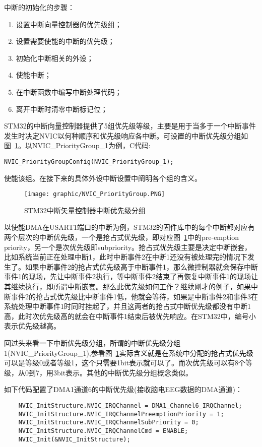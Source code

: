 	中断的初始化的步骤：
\begin{enumerate}
\item	设置中断向量控制器的优先级组；
\item	设置需要使能的中断的优先级；
\item	初始化中断相关的外设；
\item	使能中断；
\item	在中断函数中编写中断处理代码；
\item	离开中断时清零中断标记位；
\end{enumerate}

STM32的中断向量控制器提供了5组优先级等级，主要是用于当多于一个中断事件发生时决定NVIC以何种顺序和优先级响应各中断。可设置的中断优先级分组如图~\ref{NVICPriGroup}。以NVIC\_{}PriorityGroup\_{}1为例，C代码:

\verb|NVIC_PriorityGroupConfig(NVIC_PriorityGroup_1);|

使能该组。在接下来的具体外设中断设置中阐明各个组的含义。
\begin{figure}[!hbp]
\begin{center}
\texttt{[image: graphic/NVIC\_PriorityGroup.PNG]}
\caption{STM32中断矢量控制器中断优先级分组 \label{NVICPriGroup}}
\end{center}
\end{figure}

以使能DMA在USART1端口的中断为例，STM32的固件库中的每个中断都对应有两个层次的中断优先级，一个是抢占式优先级，即对应图~\ref{NVICPriGroup}中的pre-emption priority，另一个是次优先级即subpriority。抢占式优先级主要是决定中断嵌套，比如系统当前正在处理中断1，此时中断事件2在中断1还没有被处理完的情况下发生了。如果中断事件2的抢占式优先级高于中断事件1，那么微控制器就会保存中断事件1的现场，先让中断事件2执行，等中断事件2结束了再恢复中断事件1的现场让其继续执行，即所谓中断嵌套。那么此优先级如何工作？继续刚才的例子，如果中断事件2的抢占式优先级比中断事件1低，他就会等待，如果是中断事件2和事件3在系统处理中断事件1时同时挂起了，并且这两者的抢占式中断优先级都没有中断1高，此时次优先级高的就会在中断事件1结束后被优先响应。在STM32中，编号小表示优先级越高。

回过头来看一下中断优先级分组，所谓的中断优先级分组1(NVIC\_{}PriorityGroup\_{}1),参看图~\ref{NVICPriGroup}实际含义就是在系统中分配的抢占式优先级可以是等级0或者等级1，这个只需要1bit表示就可以了。而次优先级可以有8个等级，从0到7，用3bit表示。其他的中断优先级分组概念类似。

如下代码配置了DMA1通道6的中断优先级(接收脑电EEG数据的DMA通道)：

\begin{verbatim}
	NVIC_InitStructure.NVIC_IRQChannel = DMA1_Channel6_IRQChannel;
	NVIC_InitStructure.NVIC_IRQChannelPreemptionPriority = 1;
	NVIC_InitStructure.NVIC_IRQChannelSubPriority = 0;	
	NVIC_InitStructure.NVIC_IRQChannelCmd = ENABLE;
	NVIC_Init(&NVIC_InitStructure);
\end{verbatim}

